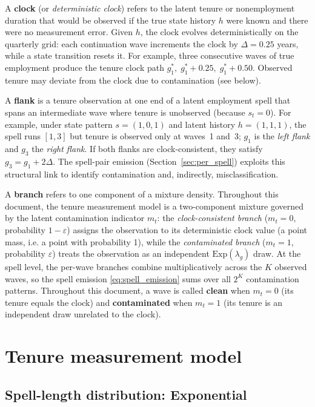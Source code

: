 \documentclass[12pt]{article}
\begin{document}
A \textbf{clock} (or \emph{deterministic clock}) refers to the
latent tenure or nonemployment duration that would be observed if the
true state history \(h\) were known and there were no measurement error.
Given \(h\), the clock evolves deterministically on the quarterly grid:
each continuation wave increments the clock by \(\Delta = 0.25\) years,
while a state transition resets it. For example, three consecutive waves
of true employment produce the tenure clock path
\(g^*_1, \; g^*_1 + 0.25, \; g^*_1 + 0.50\). Observed tenure may
deviate from the clock due to contamination (see below).

A \textbf{flank} is a tenure observation at one end of a latent
employment spell that spans an intermediate wave where tenure is
unobserved (because \(s_t = 0\)). For example, under state pattern
\(s = (1,0,1)\) and latent history \(h = (1,1,1)\), the spell runs
\([1,3]\) but tenure is observed only at waves~1 and~3; \(g_1\) is the
\emph{left flank} and \(g_3\) the \emph{right flank}. If both flanks
are clock-consistent, they satisfy \(g_3 = g_1 + 2\Delta\). The
spell-pair emission (Section~\ref{sec:per_spell}) exploits this
structural link to identify contamination and, indirectly,
misclassification.

A \textbf{branch} refers to one component of a mixture density.
Throughout this document, the tenure measurement model is a two-component
mixture governed by the latent contamination indicator \(m_{t}\):
the \emph{clock-consistent branch} (\(m_{t}=0\), probability
\(1-\varepsilon\)) assigns the observation to its deterministic clock
value (a point mass, i.e. a point with probability 1), while the \emph{contaminated branch}
(\(m_{t}=1\), probability \(\varepsilon\)) treats the observation as an
independent \(\mathrm{Exp}(\lambda_g)\) draw. At the spell level, the
per-wave branches combine multiplicatively across the \(K\) observed waves,
so the spell emission \eqref{eq:spell_emission} sums over all \(2^K\)
contamination patterns. Throughout this document, a wave is called
\textbf{clean} when \(m_t = 0\) (its tenure equals the clock) and
\textbf{contaminated} when \(m_t = 1\) (its tenure is an independent draw
unrelated to the clock).

\section{Tenure measurement model}

\subsection{Spell-length distribution: Exponential}
\end{document}
